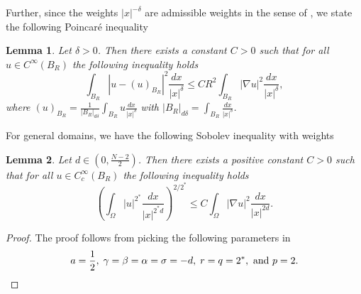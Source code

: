 \documentclass[11pt]{article}
\newtheorem{lemma}{Lemma}[section] %
\newcommand{\om} {\Omega}
\newcommand{\grad}{\nabla}
\begin{document}
Further, since the weights $|x|^{-\delta}$ are admissible weights in the sense of \cite{heinonen_potential_theory}, we state the following Poincar\'{e} inequality
\begin{lemma}\label{lem:weighted_poincare_inequality}
 Let $\delta > 0$. Then there exists a constant $C > 0$ such that for all $u \in C^{\infty}(B_R)$ the following inequality holds
 \begin{equation*}
     \int_{B_R} | u - (u)_{B_R}|^2 \frac{dx}{|x|^\delta} \leq C R^2 \int_{B_R} |\grad u|^2 \frac{dx}{|x|^{\delta}},
 \end{equation*}
 where $(u)_{B_R} = \frac{1}{|B_{R}|_{d\delta}} \int_{B_{R}} u \frac{dx}{|x|^{\delta}}$ with $|B_R|_{d \delta} = \int_{B_R} \frac{dx}{|x|^{\delta}}$.
\end{lemma}
For general domains, we have the following Sobolev inequality with weights
\begin{lemma}
Let $d \in \left(0, \frac{N-2}{2} \right)$. Then there exists a positive constant $C>0$ such that for all $u \in C_c^{\infty}(B_R)$ the following inequality holds  
\begin{equation}\label{ineq:sobolev_inequality_weight}
 \left( \int_{\om} |u |^{2^*} \frac{dx}{|x|^{2^*d}}\right)^{2/2^*}   \leq  C \int_{\om}  |\grad u |^2 \frac{dx}{|x|^{2d}}.
\end{equation}
\end{lemma}
\begin{proof}
The proof follows from picking the following parameters in \cite{caffarelli1984interpolation_sobolev}
\begin{equation*}
a = \frac{1}{2}, \; \gamma = \beta = \alpha = \sigma = - d, \; r = q = 2^*, \text{ and } p=2. \qedhere
\end{equation*}
\end{proof}
\end{document}
